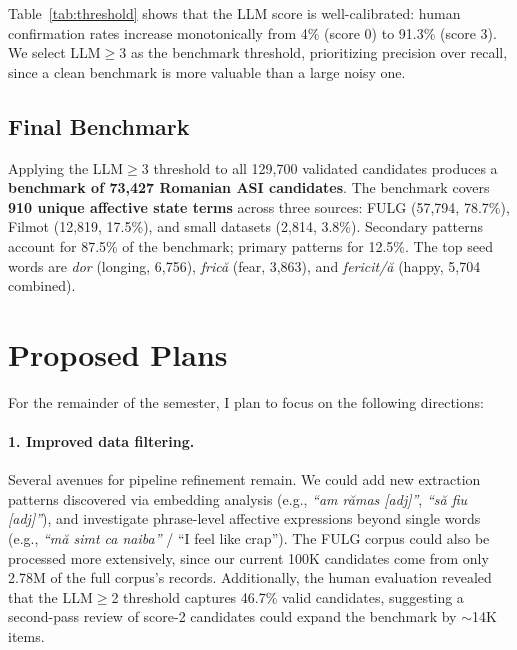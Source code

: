 \documentclass[11pt]{article}
\begin{document}
Table~\ref{tab:threshold} shows that the LLM score is well-calibrated: human confirmation rates increase monotonically from 4\% (score 0) to 91.3\% (score 3). We select LLM$\geq$3 as the benchmark threshold, prioritizing precision over recall, since a clean benchmark is more valuable than a large noisy one.

\subsection{Final Benchmark}

Applying the LLM$\geq$3 threshold to all 129,700 validated candidates produces a \textbf{benchmark of 73,427 Romanian ASI candidates}. The benchmark covers \textbf{910 unique affective state terms} across three sources: FULG (57,794, 78.7\%), Filmot (12,819, 17.5\%), and small datasets (2,814, 3.8\%). Secondary patterns account for 87.5\% of the benchmark; primary patterns for 12.5\%. The top seed words are \textit{dor} (longing, 6,756), \textit{fric\u{a}} (fear, 3,863), and \textit{fericit/\u{a}} (happy, 5,704 combined).


\section{Proposed Plans}

For the remainder of the semester, I plan to focus on the following directions:

\paragraph{1. Improved data filtering.}
Several avenues for pipeline refinement remain. We could add new extraction patterns discovered via embedding analysis (e.g., \textit{``am r\u{a}mas [adj]''}, \textit{``s\u{a} fiu [adj]''}), and investigate phrase-level affective expressions beyond single words (e.g., \textit{``m\u{a} simt ca naiba''} / ``I feel like crap''). The FULG corpus could also be processed more extensively, since our current 100K candidates come from only 2.78M of the full corpus's records. Additionally, the human evaluation revealed that the LLM$\geq$2 threshold captures 46.7\% valid candidates, suggesting a second-pass review of score-2 candidates could expand the benchmark by $\sim$14K items.
\end{document}
